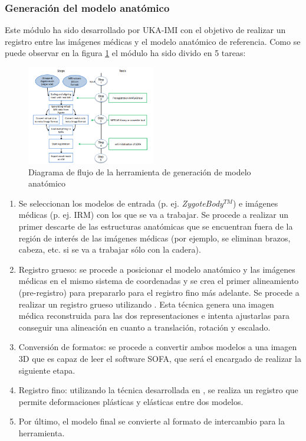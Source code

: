 \subsubsection{Generación del modelo anatómico}
Este módulo ha sido desarrollado por \ac{UKA-IMI} con el objetivo de realizar un registro entre las imágenes médicas y el modelo anatómico de referencia. Como se puede observar en la figura \ref{fig:r32} el módulo ha sido divido en 5 tareas:
\begin{figure}[h]
    \centering
    \includegraphics[width=0.5\textwidth]{IMG/rasimasd32.PNG}
    \caption{ Diagrama de flujo de la herramienta de generación de modelo anatómico}
    \label{fig:r32}
\end{figure}
\begin{enumerate}
    \item  Se seleccionan los modelos de entrada (p. ej. \emph{ZygoteBody}$^{TM}$) e imágenes médicas (p. ej. \ac{IRM}) con los que se va a trabajar. Se procede a realizar un primer descarte de las estructuras anatómicas que se encuentran fuera de la región de interés de las imágenes médicas (por ejemplo, se eliminan brazos, cabeza, etc. si se va a trabajar sólo con la cadera).
    \item Registro grueso: se procede a posicionar el modelo anatómico y las imágenes médicas en el mismo sistema de coordenadas y se crea el primer alineamiento (pre-registro) para prepararlo para el registro fino más adelante. Se procede a realizar un registro grueso utilizando \cite{antoinemri}. Esta técnica genera una imagen médica reconstruida para las dos representaciones e intenta ajustarlas para conseguir una alineación en cuanto a translación, rotación y escalado.
    \item Conversión de formatos: se procede a convertir ambos modelos a una imagen 3D que es capaz de leer el software \ac{SOFA}, que será el encargado de realizar la siguiente etapa.
    \item Registro fino: utilizando la técnica desarrollada en \cite{gilles2008}, se realiza un registro que permite deformaciones plásticas y elásticas entre dos modelos.
    \item Por último, el modelo final se convierte al formato de intercambio para la herramienta.
\end{enumerate}

